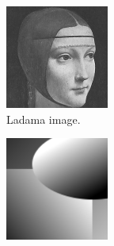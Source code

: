 \documentclass[abstracton]{scrreprt}
\begin{document}
\begin{figure}[!ht]
\begin{subfigure}[b]{0.3\textwidth}
                    \includegraphics[width=\textwidth]{img/images/ladama.png}
                    \caption{Ladama image.}
                \end{subfigure}
                \begin{subfigure}[b]{0.3\textwidth}
                    \includegraphics[width=\textwidth]{img/images/synth.png}

\end{subfigure}
\end{figure}
\end{document}
